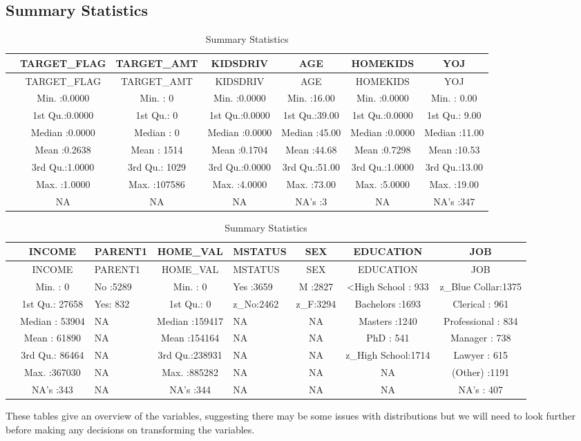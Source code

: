 \documentclass[]{article}
\begin{document}
\hypertarget{summary-statistics}{%
\subsection{Summary Statistics}\label{summary-statistics}}

\begin{longtable}[]{@{}lcccccc@{}}
\caption{Summary Statistics}\tabularnewline
\toprule
& TARGET\_FLAG & TARGET\_AMT & KIDSDRIV & AGE & HOMEKIDS &
YOJ\tabularnewline
\midrule
\endfirsthead
\toprule
& TARGET\_FLAG & TARGET\_AMT & KIDSDRIV & AGE & HOMEKIDS &
YOJ\tabularnewline
\midrule
\endhead
& Min. :0.0000 & Min. : 0 & Min. :0.0000 & Min. :16.00 & Min. :0.0000 &
Min. : 0.00\tabularnewline
& 1st Qu.:0.0000 & 1st Qu.: 0 & 1st Qu.:0.0000 & 1st Qu.:39.00 & 1st
Qu.:0.0000 & 1st Qu.: 9.00\tabularnewline
& Median :0.0000 & Median : 0 & Median :0.0000 & Median :45.00 & Median
:0.0000 & Median :11.00\tabularnewline
& Mean :0.2638 & Mean : 1514 & Mean :0.1704 & Mean :44.68 & Mean :0.7298
& Mean :10.53\tabularnewline
& 3rd Qu.:1.0000 & 3rd Qu.: 1029 & 3rd Qu.:0.0000 & 3rd Qu.:51.00 & 3rd
Qu.:1.0000 & 3rd Qu.:13.00\tabularnewline
& Max. :1.0000 & Max. :107586 & Max. :4.0000 & Max. :73.00 & Max.
:5.0000 & Max. :19.00\tabularnewline
& NA & NA & NA & NA's :3 & NA & NA's :347\tabularnewline
\bottomrule
\end{longtable}

\begin{longtable}[]{@{}lclclccc@{}}
\caption{Summary Statistics}\tabularnewline
\toprule
& INCOME & PARENT1 & HOME\_VAL & MSTATUS & SEX & EDUCATION &
JOB\tabularnewline
\midrule
\endfirsthead
\toprule
& INCOME & PARENT1 & HOME\_VAL & MSTATUS & SEX & EDUCATION &
JOB\tabularnewline
\midrule
\endhead
& Min. : 0 & No :5289 & Min. : 0 & Yes :3659 & M :2827 & \textless{}High
School : 933 & z\_Blue Collar:1375\tabularnewline
& 1st Qu.: 27658 & Yes: 832 & 1st Qu.: 0 & z\_No:2462 & z\_F:3294 &
Bachelors :1693 & Clerical : 961\tabularnewline
& Median : 53904 & NA & Median :159417 & NA & NA & Masters :1240 &
Professional : 834\tabularnewline
& Mean : 61890 & NA & Mean :154164 & NA & NA & PhD : 541 & Manager :
738\tabularnewline
& 3rd Qu.: 86464 & NA & 3rd Qu.:238931 & NA & NA & z\_High School:1714 &
Lawyer : 615\tabularnewline
& Max. :367030 & NA & Max. :885282 & NA & NA & NA & (Other)
:1191\tabularnewline
& NA's :343 & NA & NA's :344 & NA & NA & NA & NA's : 407\tabularnewline
\bottomrule
\end{longtable}

These tables give an overview of the variables, suggesting there may be
some issues with distributions but we will need to look further before
making any decisions on transforming the variables.
\end{document}
